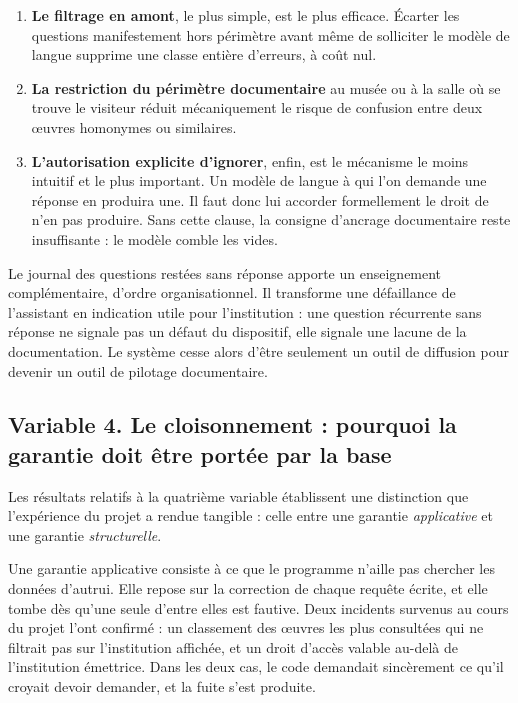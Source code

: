 \begin{enumerate}
  \item \textbf{Le filtrage en amont}, le plus simple, est le plus efficace.
        Écarter les questions manifestement hors périmètre avant même de
        solliciter le modèle de langue supprime une classe entière d'erreurs, à
        coût nul.

  \item \textbf{La restriction du périmètre documentaire} au musée ou à la salle
        où se trouve le visiteur réduit mécaniquement le risque de confusion
        entre deux œuvres homonymes ou similaires.

  \item \textbf{L'autorisation explicite d'ignorer}, enfin, est le mécanisme le
        moins intuitif et le plus important. Un modèle de langue à qui l'on
        demande une réponse en produira une. Il faut donc lui accorder
        formellement le droit de n'en pas produire. Sans cette clause, la
        consigne d'ancrage documentaire reste insuffisante : le modèle comble
        les vides.
\end{enumerate}

Le journal des questions restées sans réponse apporte un enseignement
complémentaire, d'ordre organisationnel. Il transforme une défaillance de
l'assistant en indication utile pour l'institution : une question récurrente
sans réponse ne signale pas un défaut du dispositif, elle signale une lacune de
la documentation. Le système cesse alors d'être seulement un outil de diffusion
pour devenir un outil de pilotage documentaire.

\subsection{Variable 4. Le cloisonnement : pourquoi la garantie doit être portée par la base}

Les résultats relatifs à la quatrième variable établissent une distinction que
l'expérience du projet a rendue tangible : celle entre une garantie
\emph{applicative} et une garantie \emph{structurelle}.

Une garantie applicative consiste à ce que le programme n'aille pas chercher les
données d'autrui. Elle repose sur la correction de chaque requête écrite, et
elle tombe dès qu'une seule d'entre elles est fautive. Deux incidents survenus
au cours du projet l'ont confirmé : un classement des œuvres les plus consultées
qui ne filtrait pas sur l'institution affichée, et un droit d'accès valable
au-delà de l'institution émettrice. Dans les deux cas, le code demandait
sincèrement ce qu'il croyait devoir demander, et la fuite s'est produite.


